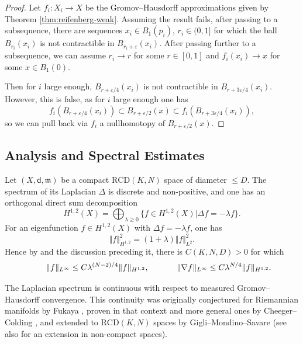 \documentclass[12pt]{amsart}
\theoremstyle{definition}
\numberwithin{equation}{section}
\newcommand{\sobo}{H^{1,2}}
\newcommand{\rcd}{\text{RCD}}
\newcommand{\mm}{\mathfrak{m}}
\begin{document}
\begin{proof}
    Let $f_i : X_i \to X$ be the Gromov--Hausdorff approximations given by Theorem \ref{thm:reifenberg-weak}. Assuming the result fails, after passing to a subsequence, there are  sequences $x_i \in B_1(p_i)$, $r_i \in ( 0 , 1 ]$ for which the ball $B_{r_i} (x_i)$ is not contractible in $B_{r_i + \varepsilon } (x_i)$. After passing further to a subsequence, we can assume $r_i \to r$ for some $r \in [ 0 , 1]$ and $f_i (x_i) \to x$ for some $x \in B_1(0)$. 
    
    Then for $i$ large enough, $B_{r + \varepsilon /4}(x_i)$ is not contractible in $B_{r + 3 \varepsilon /4} (x_i)$. However, this is false, as for $i$ large enough one has
    \[    f_i (B_{r+ \varepsilon /4 }( x_i)) \subset  B_{r+ \varepsilon / 2} (x) \subset  f_i (B_{r+ 3 \varepsilon /4 }( x_i))  ,   \]
    so we can pull back via $f_i$ a nullhomotopy of $B_{r + \varepsilon / 2} (x)$.
\end{proof}


\subsection{Analysis and Spectral Estimates}
Let $(X,\mathsf{d},  \mm ) $ be a compact $\rcd (K,N)$ space of diameter $\leq D$. The spectrum  of its Laplacian $\Delta$ is discrete and non-positive, and one has an orthogonal direct sum decomposition 
\[      \sobo (X) = \bigoplus_{\lambda \geq 0} \{ f \in \sobo (X) \vert \Delta f = - \lambda f  \}   .  \]
For an eigenfunction $f \in \sobo (X) $ with $\Delta f = - \lambda f $, one has
\[     \Vert f \Vert _{\sobo} ^2 = (1 + \lambda ) \Vert f \Vert _{L^2} ^2 .  \]
Hence by \cite[Proposition 7.1]{ambrosio-honda-portegies-tewodrose} and the discussion preceding it, there is $C(K,N, D) > 0 $ for which
 \begin{equation}\label{eq:eigenest}
   \hspace{0.6cm} \| f \|_{L^\infty} \leq C \lambda ^{(N-2)/4} \Vert f \Vert _{\sobo }  ,\hspace{1.2cm} \| \nabla  f  \|_{L^\infty} \leq C  \lambda ^{ N/4} \Vert f \Vert _{\sobo }.
 \end{equation}
 
The Laplacian spectrum is continuous with respect to measured Gromov--Hausdorff convergence. This continuity was originally conjectured for Riemannian manifolds by Fukaya \cite{fukaya}, proven in that context and more general ones by Cheeger--Colding \cite{cheeger-colding-iii}, and extended to $\rcd (K,N)$ spaces by Gigli--Mondino--Savare \cite{gigli-mondino-savare} (see also \cite{ambrosio-honda} for an extension in non-compact spaces).
\end{document}
